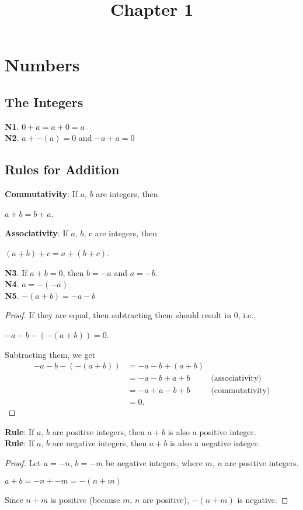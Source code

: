 \documentclass[12pt]{article}
\title{Chapter 1}
\author{}
\date{}
\begin{document}
\maketitle
\newtheorem{theorem}{Theorem}
\newtheorem{corollary}{Corollary}[theorem]

\section{Numbers}
\subsection{The Integers}
\textbf{N1}. $0+a=a+0=a$ \\
\textbf{N2}. $a+-(a)=0$ and $-a+a=0$
\subsection{Rules for Addition}
\textbf{Commutativity}: If $a$, $b$ are integers, then
\begin{center}
$a+b=b+a$.
\end{center}
\textbf{Associativity}: If $a$, $b$, $c$ are integers, then
\begin{center}
$(a+b)+c=a+(b+c)$.
\end{center}
\textbf{N3}. If $a+b=0$, then $b=-a$ and $a=-b$. \\
\textbf{N4}. $a=-(-a)$ \\
\textbf{N5}. $-(a+b)=-a-b$
\begin{proof}
If they are equal, then subtracting them should result in 0, i.e.,
\begin{center}
$-a-b-(-(a+b))=0$.
\end{center}
Subtracting them, we get
\begin{align*}
-a-b-(-(a+b))&=-a-b+(a+b) \\
&=-a-b+a+b &\text{(associativity)} \\
&=-a+a-b+b &\text{(commutativity)} \\
&=0.
\end{align*}
\end{proof}
\noindent \textbf{Rule}: If $a$, $b$ are positive integers, then $a+b$ is also a positive integer. \\
\textbf{Rule}: If $a$, $b$ are negative integers, then $a+b$ is also a negative integer.
\begin{proof}
Let $a=-n$, $b=-m$ be negative integers, where $m$, $n$ are positive integers.
\begin{center}
$a+b=-n+-m=-(n+m)$
\end{center}
Since $n+m$ is positive (because $m$, $n$ are positive), $-(n+m)$ is negative.
\end{proof}
\end{document}
